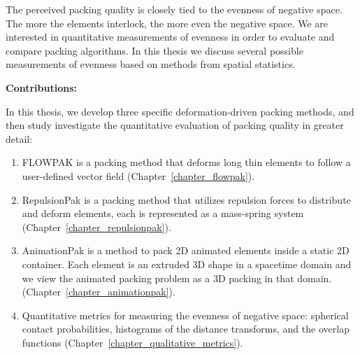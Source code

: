 
\newtext
{
The perceived packing quality is closely tied to the evenness of negative space.
The more the elements interlock, the more even the negative space. 
We are interested in quantitative measurements of evenness 
in order to evaluate and compare packing algorithms.
In this thesis we discuss several possible measurements of 
evenness based on methods from spatial statistics.
}

\textbf{Contributions:} \newtext
{
In this thesis, we develop three specific deformation-driven packing methods, 
and then study investigate the quantitative evaluation of packing quality in greater detail:
\begin{enumerate}
\item FLOWPAK is a packing method that deforms long thin elements to follow a user-defined vector field (Chapter~\ref{chapter_flowpak}).
\item RepulsionPak is a packing method that utilizes repulsion forces to distribute and deform elements,
	each is represented as a mass-spring system (Chapter~\ref{chapter_repulsionpak}).
\item AnimationPak is a method to pack 2D animated elements inside a static 2D container. 
	Each element is an extruded 3D shape in a spacetime domain 
	and we view the animated packing problem as a 3D packing in that domain.
	(Chapter~\ref{chapter_animationpak}). 
\item  Quantitative metrics for measuring the evenness of negative space: spherical contact probabilities,
histograms of the distance transforms, and the overlap functions (Chapter~\ref{chapter_qualitative_metrics}). 
\end{enumerate}
}




